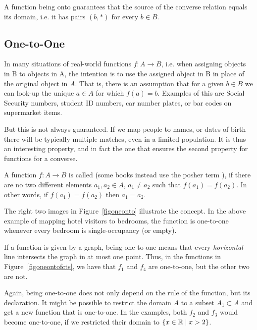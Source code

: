 A function being onto guarantees that the source of the converse relation
equals its domain, i.e. it has pairs
$(b,*)$ for every $b\in B$.

\subsection{One-to-One}

In many situations of real-world functions $f\colon A\to B$, i.e. when
assigning objects in B to objects in A, the
intention is to use the assigned object in B in place of the original object in $A$.
That is, there is an assumption that for a given $b\in B$ we can look-up the unique
$a\in A$ for which $f(a)=b$. Examples of this are Social Security numbers, student ID
numbers, car number plates,
or bar codes on supermarket items.

But this is not always guaranteed. If we map people to names, or dates of birth there
will be typically multiple matches, even in a limited population. It is thus an
interesting property, and in fact the one that ensures the second property for functions
for a converse.

\begin{defn}
A function $f\colon A\to B$ is called  (some books instead use the posher
term ), if there are no two different elements $a_1,a_2\in A$,
$a_1\not=a_2$ such that $f(a_1)=f(a_2)$. In other words, if $f(a_1)=f(a_2)$ then
$a_1=a_2$.
\end{defn}

The right two images in Figure~\ref{figoneonto} illustrate the concept.
In the above example of mapping hotel visitors to bedrooms, the function is one-to-one
whenever every bedroom is single-occupancy (or empty).
\medskip

If a function is given by a graph, being one-to-one means that every {\em horizontal}
line intersects the graph in at most one point. Thus,
in the functions in Figure~\ref{figoneontofcts}, we have that $f_1$ and $f_4$ are
one-to-one, but the other two are not.

Again, being one-to-one does not only depend on the rule of the function, but its
declaration. It might be possible to restrict the domain $A$ to a subset $A_1\subset A$
and get a new function that is one-to-one. In the examples, both $f_2$ and $f_3$ would
become one-to-one, if we restricted their domain to $\{x\in{\mathbb R}\mid x>2\}$.
\medskip

